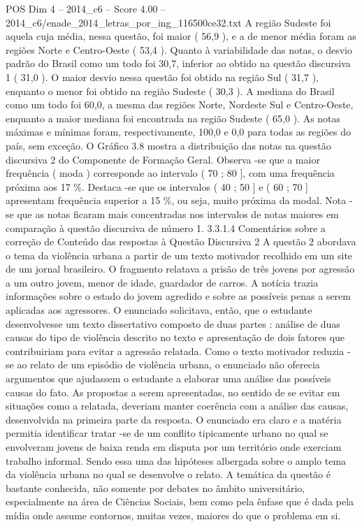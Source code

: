 \begin{textsample}{POS Dim 4 – 2014\_c6 – Score 4.00 – 2014\_c6/enade\_2014\_letras\_por\_ing\_116500ce32.txt}
A região Sudeste foi aquela cuja média, nessa questão, foi maior ( 56,9 ), e a de menor média foram as regiões Norte e Centro-Oeste ( 53,4 ).
Quanto à variabilidade das notas, o desvio padrão do Brasil como um todo foi 30,7, inferior ao obtido na questão discursiva 1 ( 31,0 ).
O maior desvio nessa questão foi obtido na região Sul ( 31,7 ), enquanto o menor foi obtido na região Sudeste ( 30,3 ).
A mediana do Brasil como um todo foi 60,0, a mesma das regiões Norte, Nordeste Sul e Centro-Oeste, enquanto a maior mediana foi encontrada na região Sudeste ( 65,0 ).
As notas máximas e mínimas foram, respectivamente, 100,0 e 0,0 para todas as regiões do país, sem exceção.
O Gráfico 3.8 mostra a distribuição das notas na questão discursiva 2 do Componente de Formação Geral.
Observa -se que a maior frequência ( moda ) corresponde ao intervalo ( 70 ; 80 ], com uma frequência próxima aos 17 \%.
Destaca -se que os intervalos ( 40 ; 50 ] e ( 60 ; 70 ] apresentam frequência superior a 15 \%, ou seja, muito próxima da modal.
Nota -se que as notas ficaram mais concentradas nos intervalos de notas maiores em comparação à questão discursiva de número 1. 3.3.1.4 Comentários sobre a correção de Conteúdo das respostas à Questão Discursiva 2 A questão 2 abordava o tema da violência urbana a partir de um texto motivador recolhido em um site de um jornal brasileiro.
O fragmento relatava a prisão de três jovens por agressão a um outro jovem, menor de idade, guardador de carros.
A notícia trazia informações sobre o estado do jovem agredido e sobre as possíveis penas a serem aplicadas aos agressores.
O enunciado solicitava, então, que o estudante desenvolvesse um texto dissertativo composto de duas partes : análise de duas causas do tipo de violência descrito no texto e apresentação de dois fatores que contribuiriam para evitar a agressão relatada.
Como o texto motivador reduzia -se ao relato de um episódio de violência urbana, o enunciado não oferecia argumentos que ajudassem o estudante a elaborar uma análise das possíveis causas do fato.
As propostas a serem apresentadas, no sentido de se evitar em situações como a relatada, deveriam manter coerência com a análise das causas, desenvolvida na primeira parte da resposta.
O enunciado era claro e a matéria permitia identificar tratar -se de um conflito tipicamente urbano no qual se envolveram jovens de baixa renda em disputa por um território onde exerciam trabalho informal.
Sendo essa uma das hipóteses albergada sobre o amplo tema da violência urbana no qual se desenvolve o relato.
A temática da questão é bastante conhecida, não somente por debates no âmbito universitário, especialmente na área de Ciências Sociais, bem como pela ênfase que é dada pela mídia onde assume contornos, muitas vezes, maiores do que o problema em si.

\end{textsample}
